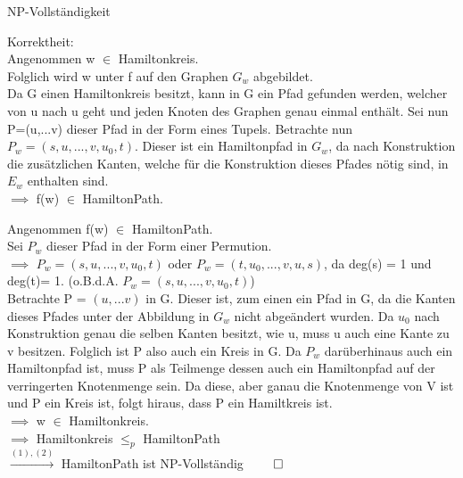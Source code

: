 \documentclass[answers]{submit}
\begin{document}
\begin{exercise}[6]{NP-Vollständigkeit}
{    Korrektheit: \\

    Angenommen w $\in$ Hamiltonkreis. \\

    Folglich wird w unter f auf den Graphen $G_w$ abgebildet. \\

    Da G einen Hamiltonkreis besitzt, kann in G ein Pfad gefunden werden, welcher von u nach u geht und jeden Knoten des Graphen genau einmal enthält. Sei nun P=(u,...v) dieser Pfad in der Form eines Tupels. Betrachte nun $P_w=(s,u,...,v,u_0,t)$. Dieser ist ein Hamiltonpfad in $G_w$, da nach Konstruktion die zusätzlichen Kanten, welche für die Konstruktion dieses Pfades nötig sind, in $E_w$ enthalten sind. \\

    $\implies$ f(w) $\in$ HamiltonPath.

    Angenommen f(w) $\in$ HamiltonPath.\\

    Sei $P_w$ dieser Pfad in der Form einer Permution. \\

    $\implies$ $P_w=(s,u,...,v,u_0,t)$ oder $P_w=(t,u_0,...,v,u,s)$, da deg(s) = 1  und deg(t)= 1.
    (o.B.d.A. $P_w=(s,u,...,v,u_0,t)$) \\

    Betrachte P = $(u,...v)$ in G. Dieser ist, zum einen ein Pfad in G, da die Kanten dieses Pfades unter der Abbildung in $G_w$ nicht abgeändert wurden.
    Da $u_0$ nach Konstruktion genau die selben Kanten besitzt, wie u, muss u auch eine Kante zu v besitzen. Folglich ist P also auch ein Kreis in G.
    Da $P_w$ darüberhinaus auch ein Hamiltonpfad ist, muss P als Teilmenge dessen auch ein Hamiltonpfad auf der verringerten Knotenmenge sein.
    Da diese, aber ganau die Knotenmenge von V ist und P ein Kreis ist, folgt hiraus, dass P ein Hamiltkreis ist. \\

    $\implies$ w $\in$ Hamiltonkreis. \\

    $\implies$ Hamiltonkreis $\leq_p$ HamiltonPath \\

    $\xrightarrow{(1),(2)}$ HamiltonPath ist NP-Vollständig $\qed$
  }
\end{exercise}
\end{document}
